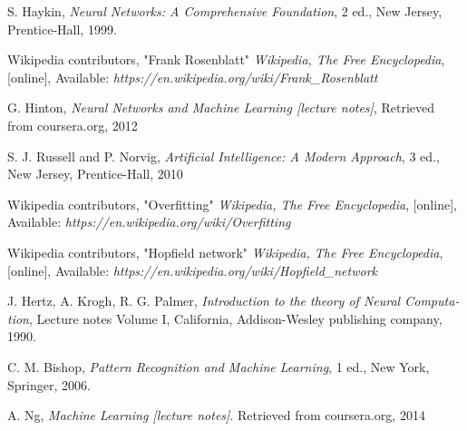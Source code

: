 \documentclass[11pt,a4paper,twocolumn]{article}
\begin{document}
\begin{latin}
{
\small
\singlespacing
\setlength{\itemsep}{-2ex}
\renewcommand{\refname}{\rl{{مراجع}\hfill}}
%
\begin{thebibliography}{1}

      S. Haykin, {\em Neural Networks: A Comprehensive Foundation}, 2 ed., New Jersey, Prentice-Hall, 1999.
    
     Wikipedia contributors, "Frank Rosenblatt" {\em Wikipedia, The Free Encyclopedia}, [online], Available: {\em https://en.wikipedia.org/wiki/Frank\_Rosenblatt}
        
	  G. Hinton, {\em Neural Networks and Machine Learning [lecture notes]}, Retrieved from coursera.org, 2012
        
      S. J. Russell and P. Norvig, {\em Artificial Intelligence: A Modern Approach}, 3 ed., New Jersey, Prentice-Hall, 2010
    
     Wikipedia contributors, "Overfitting" {\em Wikipedia, The Free Encyclopedia}, [online], Available: {\em https://en.wikipedia.org/wiki/Overfitting}
    
     Wikipedia contributors, "Hopfield network" {\em Wikipedia, The Free Encyclopedia}, [online], Available: {\em https://en.wikipedia.org/wiki/Hopfield\_network }
    
     J. Hertz, A. Krogh, R. G. Palmer, {\em Introduction to the theory of Neural Computation}, Lecture notes Volume I, California, Addison-Wesley publishing company, 1990.
    
     C. M. Bishop, {\em Pattern Recognition and Machine Learning}, 1 ed., New York, Springer, 2006.


      A. Ng, {\em Machine Learning [lecture notes]}. Retrieved from coursera.org, 2014    

  \end{thebibliography}
}
\end{latin}
\end{document}
